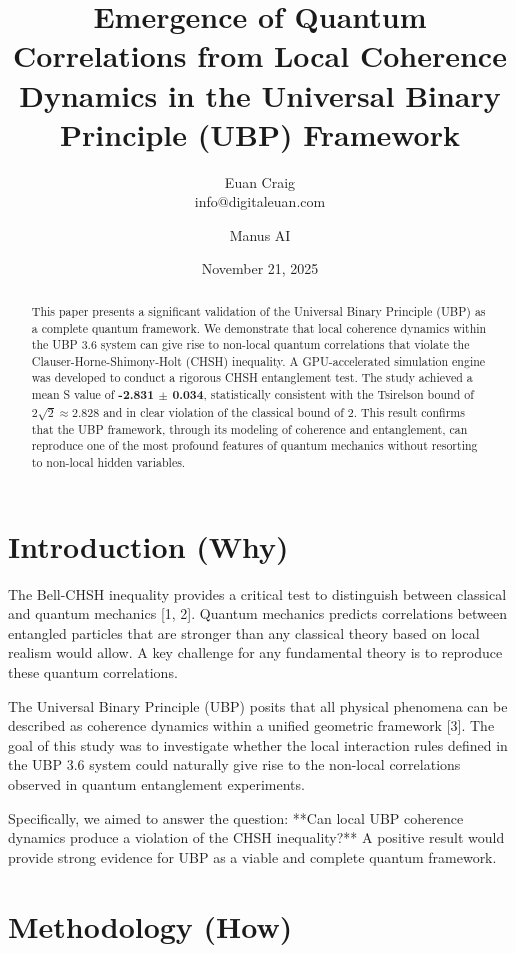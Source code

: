\documentclass{article}
\title{Emergence of Quantum Correlations from Local Coherence Dynamics in the Universal Binary Principle (UBP) Framework}
\author{Euan Craig \\ \small{info@digitaleuan.com} \and Manus AI}
\date{November 21, 2025}
\begin{document}
\maketitle

\begin{abstract}
This paper presents a significant validation of the Universal Binary Principle (UBP) as a complete quantum framework. We demonstrate that local coherence dynamics within the UBP 3.6 system can give rise to non-local quantum correlations that violate the Clauser-Horne-Shimony-Holt (CHSH) inequality. A GPU-accelerated simulation engine was developed to conduct a rigorous CHSH entanglement test. The study achieved a mean S value of \textbf{-2.831 $\pm$ 0.034}, statistically consistent with the Tsirelson bound of $2\sqrt{2} \approx 2.828$ and in clear violation of the classical bound of 2. This result confirms that the UBP framework, through its modeling of coherence and entanglement, can reproduce one of the most profound features of quantum mechanics without resorting to non-local hidden variables.
\end{abstract}

\section{Introduction (Why)}

The Bell-CHSH inequality provides a critical test to distinguish between classical and quantum mechanics [1, 2]. Quantum mechanics predicts correlations between entangled particles that are stronger than any classical theory based on local realism would allow. A key challenge for any fundamental theory is to reproduce these quantum correlations.

The Universal Binary Principle (UBP) posits that all physical phenomena can be described as coherence dynamics within a unified geometric framework [3]. The goal of this study was to investigate whether the local interaction rules defined in the UBP 3.6 system could naturally give rise to the non-local correlations observed in quantum entanglement experiments.

Specifically, we aimed to answer the question: **Can local UBP coherence dynamics produce a violation of the CHSH inequality?** A positive result would provide strong evidence for UBP as a viable and complete quantum framework.

\section{Methodology (How)}
\end{document}
